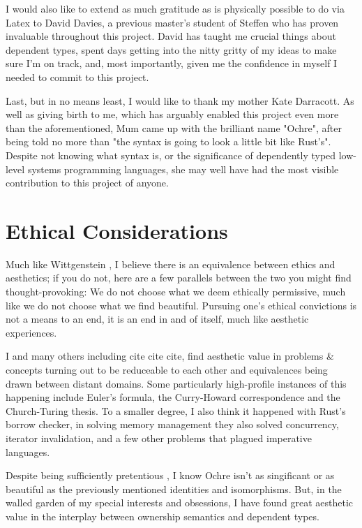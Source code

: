 \documentclass[12pt,twoside]{report}
\begin{document}
I would also like to extend as much gratitude as is physically possible to do via Latex to David Davies, a previous master's student of Steffen who has proven invaluable throughout this project. David has taught me crucial things about dependent types, spent days getting into the nitty gritty of my ideas to make sure I'm on track, and, most importantly, given me the confidence in myself I needed to commit to this project.



Last, but in no means least, I would like to thank my mother Kate Darracott. As well as giving birth to me, which has arguably enabled this project even more than the aforementioned, Mum came up with the brilliant name "Ochre", after being told no more than "the syntax is going to look a little bit like Rust's". Despite not knowing what syntax is, or the significance of dependently typed low-level systems programming languages, she may well have had the most visible contribution to this project of anyone. 

\newpage
\section*{Ethical Considerations}
Much like Wittgenstein \citep[proposition 6.421]{wittgensteinTractatusLogicophilosophicus1922}, I believe there is an equivalence between ethics and aesthetics; if you do not, here are a few parallels between the two you might find thought-provoking: We do not choose what we deem ethically permissive, much like we do not choose what we find beautiful. Pursuing one's ethical convictions is not a means to an end, it is an end in and of itself, much like aesthetic experiences.

I and many others including cite cite cite, find aesthetic value in problems \& concepts turning out to be reduceable to each other and equivalences being drawn between distant domains. Some particularly high-profile instances of this happening include Euler's formula, the Curry-Howard correspondence and the Church-Turing thesis. To a smaller degree, I also think it happened with Rust's borrow checker, in solving memory management they also solved concurrency, iterator invalidation, and a few other problems that plagued imperative languages.

Despite being sufficiently pretentious \cite[Ethical Considerations]{lidburyOchreDependentlyTyped2024}, I know Ochre isn't as singificant or as beautiful as the previously mentioned identities and isomorphisms. But, in the walled garden of my special interests and obsessions, I have found great aesthetic value in the interplay between ownership semantics and dependent types.
\end{document}
